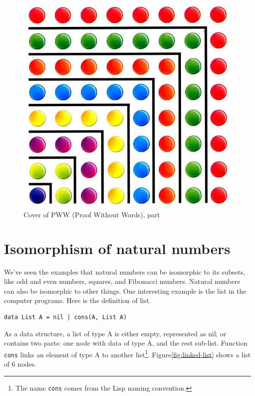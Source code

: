 \documentclass[UTF8]{article}
\begin{document}
\begin{figure}[htbp]
 \centering
 \includegraphics[scale=0.2]{img/PWW.jpg}
 \caption{Cover of PWW (Proof Without Words), part}
 \label{fig:PWW}
\end{figure}

\section{Isomorphism of natural numbers}

We've seen the examples that natural numbers can be isomorphic to its subsets, like odd and even numbers, squares, and Fibonacci numbers. Natural numbers can also be isomorphic to other things. One interesting example is the list in the computer programs. Here is the definition of list.

\lstset{frame=none}
\begin{lstlisting}
data List A = nil | cons(A, List A)
\end{lstlisting}

As a data structure, a list of type A is either empty, represented as nil; or contains two parts: one node with data of type A, and the rest sub-list. Function \texttt{cons} links an element of type A to another list\footnote{The name \texttt{cons} comes from the Lisp naming convention.}. Figure\ref{fig:linked-list} shows a list of 6 nodes.
\end{document}
